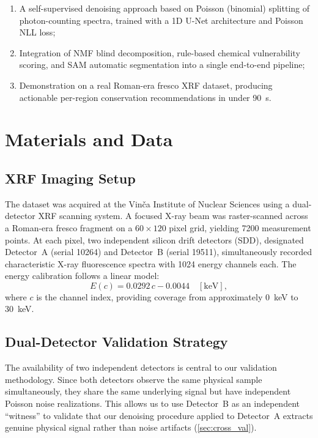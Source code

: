 \documentclass[twocolumn,11pt]{article}
\begin{document}
\begin{enumerate}
  \item A self-supervised denoising approach based on Poisson (binomial)
        splitting of photon-counting spectra, trained with a 1D U-Net
        architecture and Poisson NLL loss;
  \item Integration of NMF blind decomposition, rule-based chemical
        vulnerability scoring, and SAM automatic segmentation into a
        single end-to-end pipeline;
  \item Demonstration on a real Roman-era fresco XRF dataset, producing
        actionable per-region conservation recommendations in under
        \SI{90}{\second}.
\end{enumerate}


\section{Materials and Data}
\label{sec:data}

\subsection{XRF Imaging Setup}

The dataset was acquired at the Vin\v{c}a Institute of Nuclear Sciences using
a dual-detector XRF scanning system. A focused X-ray beam was raster-scanned
across a Roman-era fresco fragment on a $60 \times 120$ pixel grid, yielding
\num{7200} measurement points. At each pixel, two independent silicon drift
detectors (SDD), designated Detector~A (serial 10264) and Detector~B (serial
19511), simultaneously recorded characteristic X-ray fluorescence spectra
with \num{1024} energy channels each. The energy calibration follows a linear
model:
\begin{equation}
  E(c) = 0.0292\,c - 0.0044 \quad [\text{keV}],
  \label{eq:energy_cal}
\end{equation}
where $c$ is the channel index, providing coverage from approximately
\SI{0}{\kilo\electronvolt} to \SI{30}{\kilo\electronvolt}.

\subsection{Dual-Detector Validation Strategy}

The availability of two independent detectors is central to our validation
methodology. Since both detectors observe the same physical sample
simultaneously, they share the same underlying signal but have independent
Poisson noise realizations. This allows us to use Detector~B as an
independent ``witness'' to validate that our denoising procedure applied to
Detector~A extracts genuine physical signal rather than noise artifacts
(\cref{sec:cross_val}).
\end{document}
